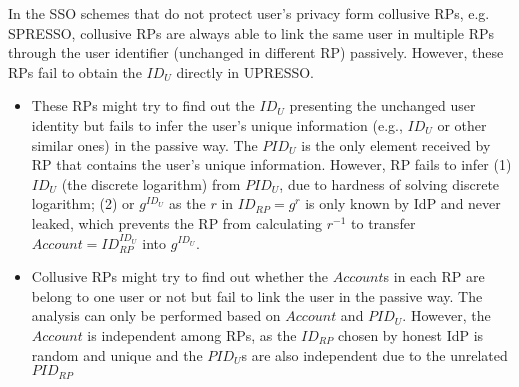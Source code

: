In the SSO schemes that do not protect user's privacy form collusive RPs, e.g. SPRESSO, collusive RPs are always able to link the same user in multiple RPs through the user identifier (unchanged in different RP) passively. However, these RPs fail to obtain the $ID_U$ directly in UPRESSO.
\begin{itemize}
\item These RPs might try to find out the $ID_U$ presenting the unchanged user identity but fails to infer the user's unique information (e.g., $ID_U$ or other similar ones) in the passive way. The $PID_U$ is the only element received by RP that contains the user's unique information. However, RP fails to infer (1) $ID_U$ (the discrete logarithm) from $PID_U$, due to hardness of solving discrete logarithm; (2) or $g^{ID_U}$ as the $r$ in $ID_{RP}=g^r$ is only known by IdP and never leaked, which prevents the RP from calculating $r^{-1}$ to transfer $Account=ID_{RP}^{ID_U}$ into  $g^{ID_U}$. 
\item Collusive RPs might try to find out whether the $Account$s in each RP are belong to one user or not but fail to link the user in the passive way. The analysis can only be performed based on $Account$ and $PID_U$. However, the $Account$ is independent among RPs, as the $ID_{RP}$ chosen by honest IdP is random and unique and the $PID_U$s are  also independent due to the unrelated $PID_{RP}$
\end{itemize}

